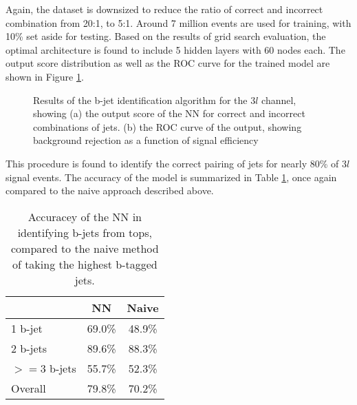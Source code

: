 Again, the dataset is downsized to reduce the ratio of correct and incorrect combination from 20:1, to 5:1. Around 7 million events are used for training, with 10\% set aside for testing. Based on the results of grid search evaluation, the optimal architecture is found to include 5 hidden layers with 60 nodes each. The output score distribution as well as the ROC curve for the trained model are shown in Figure \ref{fig:top3lresults}.

\begin{figure}[H]                                                                                                           
    \centering
   \label{fig:top3lresults}                                                                                               
   \caption{Results of the b-jet identification algorithm for the $3l$  channel, showing (a) the output score of the NN for correct and incorrect combinations of jets. (b) the ROC curve of the output, showing background rejection as a function of signal efficiency}
\end{figure}

This procedure is found to identify the correct pairing of jets for nearly 80\% of $3l$  signal events. The accuracy of the model is summarized in Table \ref{tab:topMatchAcc3l}, once again compared to the naive approach described above.

\begin{table}[H]
\centering
\caption{Accuracey of the NN in identifying b-jets from tops, compared to the naive method of taking the highest b-tagged jets.}
\begin{tabular}{l|c|c}
\hline\hline
& NN & Naive \\
\hline
1 b-jet    & 69.0\% & 48.9\% \\
2 b-jets   & 89.6\% & 88.3\% \\
$>=$3 b-jets & 55.7\% & 52.3\% \\
\hline
Overall & 79.8\% & 70.2\% \\
\hline\hline
\end{tabular}
\label{tab:topMatchAcc3l}
\end{table}


